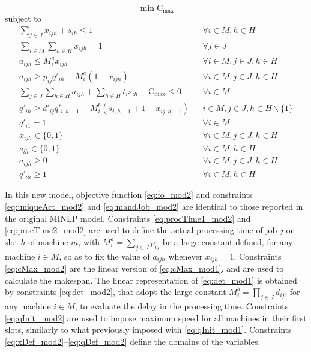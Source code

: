 \documentclass[a4paper,11pt]{article}
\begin{document}
\begin{equation}\label{eq:fo_mod2}
	\min \text{C}_{\max}
\end{equation}
\qquad subject to
\begin{eqnarray}
\label{eq:uniqueAct_mod2} \sum_{j \in J}{x_{ijh}} +  s_{ih} \leq 1 && \forall i \in M, h \in H \\
\label{eq:mandJob_mod2} \sum_{i \in M}\sum_{h \in H}{x_{ijh}} = 1 && \forall j \in J\\
\label{eq:procTime1_mod2} a_{ijh} \leq M^a_i x_{ijh} && \forall i \in M, j \in J, h \in H\\
\label{eq:procTime2_mod2} a_{ijh} \geq p_{ij} q'_{ih} - M^a_i (1-x_{ijh}) &&\forall i \in M, j \in J, h \in H\\
\label{eq:cMax_mod2} \sum_{j \in J}\sum_{h \in H} a_{ijh} + \sum_{h \in H} t_i s_{ih} - \text{C}_{\max} \leq 0 && \forall i \in M\\
\label{eq:det_mod2} q'_{ih} \geq d'_{ij} q'_{i,h-1} - M^b_i(s_{i,h-1}+1-x_{ij,h-1}) && i \in M, j \in J,  h \in H\backslash\{1\}\\
\label{eq:qInit_mod2} q'_{i1} = 1 && \forall i \in M\\
\label{eq:xDef_mod2} x_{ijh} \in \{0,1\} && \forall i \in M,  j \in J, h \in H\\
\label{eq:dDef_mod2} s_{ih} \in \{0,1\} && \forall i \in M, h \in H\\
\label{eq:aDef_mod2} a_{ijh} \geq 0 && \forall i \in M, j \in J,  h \in H\\
\label{eq:qDef_mod2} q'_{ih} \geq 1 && \forall  i \in M, h \in H
\end{eqnarray}

In this new model, objective function \eqref{eq:fo_mod2} and constraints \eqref{eq:uniqueAct_mod2} and \eqref{eq:mandJob_mod2} are identical to those reported in the original MINLP model. Constraints \eqref{eq:procTime1_mod2} and \eqref{eq:procTime2_mod2} are used to define the actual processing time of job $j$ on slot $h$ of machine $m$, with $M^a_i = \sum_{j \in J}{p_{ij}}$ be a large constant defined, for any machine $i \in M$, so as to fix the value of $a_{ijh}$ whenever $x_{ijh}=1$. 
Constraints \eqref{eq:cMax_mod2} are the linear version of \eqref{eq:cMax_mod1}, and are used to calculate the makespan. 
The linear representation of \eqref{eq:det_mod1} is obtained by constraints \eqref{eq:det_mod2}, that adopt the large constant $M^b_i = \prod_{j \in J}{d_{ij}}$, for any machine $i \in M$, to evaluate the delay in the processing time. Constraints \eqref{eq:qInit_mod2} are used to impose maximum speed for all machines in their first slots, similarly to what previously imposed with \eqref{eq:qInit_mod1}. Constraints \eqref{eq:xDef_mod2}--\eqref{eq:qDef_mod2} define the domains of the variables.
\end{document}
